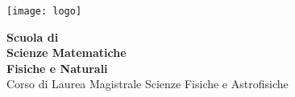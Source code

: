 \documentclass[a4paper,12pt,openright,twoside]{book}
\begin{document}
\pagestyle{fancy}
\fancyhf{}
\fancyhead[LE,RO]{\bfseries\thepage}
\fancyhead[RE]{\bfseries\footnotesize\nouppercase{\leftmark}}
\fancyhead[LO]{\bfseries\footnotesize\nouppercase{\rightmark}}
\addtolength{\headheight}{15pt}

\thispagestyle{empty}

\begin{titlepage}
  \begin{center}
    \begin{minipage}{\textwidth}
      \noindent\begin{minipage}{0.4\textwidth}%
      \texttt{[image: logo]}%
    \end{minipage}%
    \hfill
    \noindent\begin{minipage}{0.4\textwidth}
      \begin{flushright}
      {\bf
        Scuola di \\
        Scienze Matematiche \\ 
        Fisiche e Naturali \\
      }
      Corso di Laurea Magistrale Scienze Fisiche e Astrofisiche\\
      

\end{flushright}
\end{minipage}
\end{minipage}
\end{center}
\end{titlepage}
\end{document}
